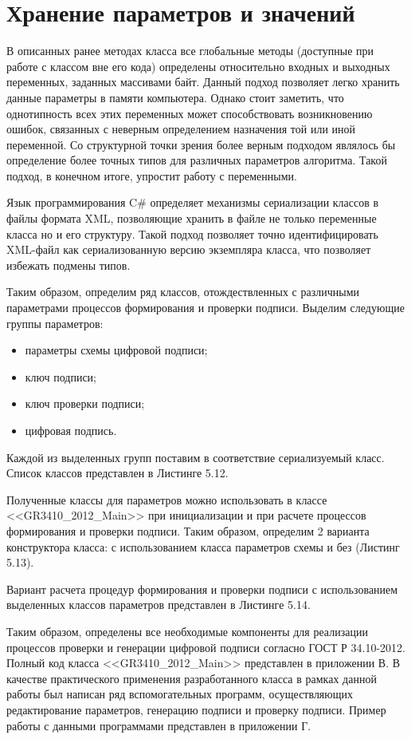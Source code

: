 \section{Хранение параметров и значений}
В описанных ранее методах класса все глобальные методы (доступные при работе с классом вне его кода) определены относительно входных и выходных переменных, заданных массивами байт. Данный подход позволяет легко хранить данные параметры в памяти компьютера. Однако стоит заметить, что однотипность всех этих переменных может способствовать возникновению ошибок, связанных с неверным определением назначения той или иной переменной. Со структурной точки зрения более верным подходом являлось бы определение более точных типов для различных параметров алгоритма. Такой подход, в конечном итоге, упростит работу с переменными.
\par
Язык программирования C\# определяет механизмы сериализации классов в файлы формата XML, позволяющие хранить в файле не только переменные класса но и его структуру. Такой подход позволяет точно идентифицировать XML-файл как сериализованную версию экземпляра класса, что позволяет избежать подмены типов.
\par
Таким образом, определим ряд классов, отождествленных с различными параметрами процессов формирования и проверки подписи. Выделим следующие группы параметров:
\begin{itemize}
	\item параметры схемы цифровой подписи;
	\item ключ подписи;
	\item ключ проверки подписи;
	\item цифровая подпись.
\end{itemize}
\par
Каждой из выделенных групп поставим в соответствие сериализуемый класс. Список классов представлен в Листинге 5.12.
\newpage

\par
Полученные классы для параметров можно использовать в классе <<GR3410\_2012\_Main>> при инициализации и при расчете процессов формирования и проверки подписи. Таким образом, определим 2 варианта конструктора класса: с использованием класса параметров схемы и без (Листинг 5.13).

\par
Вариант расчета процедур формирования и проверки подписи с использованием выделенных классов параметров представлен в Листинге 5.14.

\par
Таким образом, определены все необходимые компоненты для реализации процессов проверки и генерации цифровой подписи согласно ГОСТ Р 34.10-2012. Полный код класса <<GR3410\_2012\_Main>> представлен в приложении В. В качестве практического применения разработанного класса в рамках данной работы был написан ряд вспомогательных программ, осуществляющих редактирование параметров, генерацию подписи и проверку подписи. Пример работы с данными программами представлен в приложении Г.
